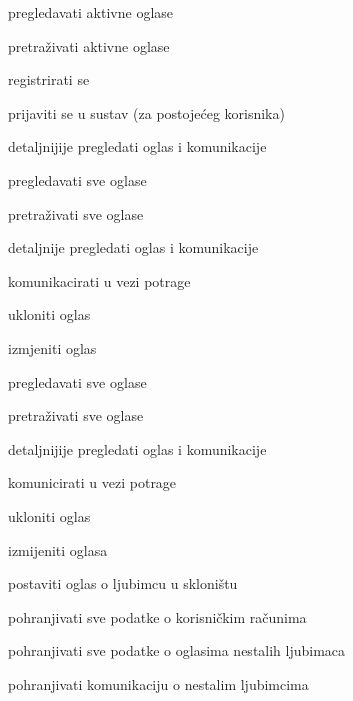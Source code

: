 			
			\begin{packed_enum}
				\item  {}
				\begin{packed_enum}
					\item pregledavati aktivne oglase
					\item pretraživati aktivne oglase
					\item registrirati se
					\item prijaviti se u sustav (za postojećeg korisnika)
					\item detaljnijije pregledati oglas i komunikacije
				\end{packed_enum}
			
				\item  {}
				\begin{packed_enum}
					\item pregledavati sve oglase
					\item pretraživati sve oglase
					\item detaljnije pregledati oglas i komunikacije
					\item komunikacirati u vezi potrage
					\item ukloniti oglas
					\item izmjeniti oglas
				\end{packed_enum}
				
				\item  {}
				\begin{packed_enum}
					\item pregledavati sve oglase
					\item pretraživati sve oglase
					\item detaljnijije pregledati oglas i komunikacije
					\item komunicirati u vezi potrage
					\item ukloniti oglas
					\item izmijeniti oglasa
					\item postaviti oglas o ljubimcu u skloništu
				\end{packed_enum}
				
				\item  {}
				\begin{packed_enum}
					\item pohranjivati sve podatke o korisničkim računima
					\item pohranjivati sve podatke o oglasima nestalih ljubimaca
					\item pohranjivati komunikaciju o nestalim ljubimcima
				\end{packed_enum}
				
			\end{packed_enum}
			
